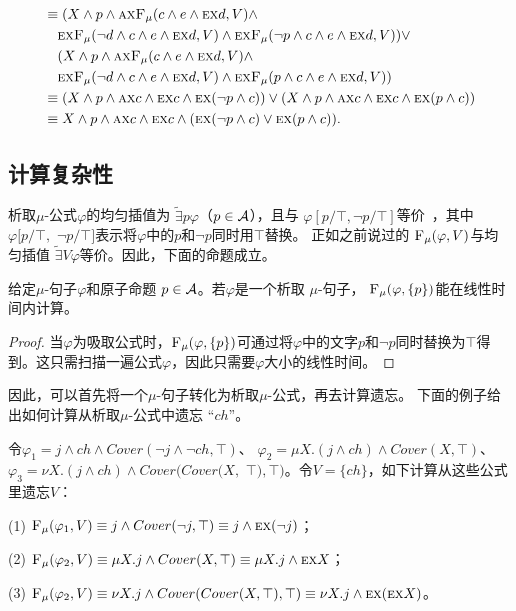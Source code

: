 \begin{example}
\begin{align*}
		& \equiv (X \wedge p \wedge \textsc{a}\textsc{x}{\textsc{F}_{\textsc{$\mu$}}}(c \wedge e \wedge \textsc{e}\textsc{x} d, V) \wedge\\
		& \quad\textsc{e}\textsc{x}{\textsc{F}_{\textsc{$\mu$}}}(\neg d \wedge c \wedge e \wedge \textsc{e}\textsc{x} d, V) \wedge  \textsc{e}\textsc{x}{\textsc{F}_{\textsc{$\mu$}}}(\neg p \wedge c \wedge e \wedge \textsc{e}\textsc{x} d, V) )\vee \\
		& \quad (X \wedge p \wedge \textsc{a}\textsc{x}{\textsc{F}_{\textsc{$\mu$}}}(c \wedge e \wedge \textsc{e}\textsc{x} d, V) \wedge\\
		& \quad\textsc{e}\textsc{x}{\textsc{F}_{\textsc{$\mu$}}}(\neg d \wedge c \wedge e \wedge \textsc{e}\textsc{x} d, V) \wedge  \textsc{e}\textsc{x}{\textsc{F}_{\textsc{$\mu$}}}( p \wedge c \wedge e \wedge \textsc{e}\textsc{x} d, V)) \\
		& \equiv (X \wedge p \wedge \textsc{a}\textsc{x} c \wedge \textsc{e}\textsc{x} c \wedge \textsc{e}\textsc{x} (\neg p \wedge c)) \vee 
		(X \wedge p \wedge \textsc{a}\textsc{x} c \wedge \textsc{e}\textsc{x} c \wedge \textsc{e}\textsc{x} (p \wedge c)) \\
		& \equiv X \wedge p \wedge \textsc{a}\textsc{x} c \wedge \textsc{e}\textsc{x} c \wedge (\textsc{e}\textsc{x} (\neg p \wedge c) \vee \textsc{e}\textsc{x} (p \wedge c)).
	\end{align*}
\end{example}

\subsection{计算复杂性}
析取$\mu$-公式$\varphi$的均匀插值为 $\widetilde{\exists}p \varphi$（$p\in {\cal A}$），且与 $\varphi[p/\top,\neg p/\top]$等价~\cite{d2006modal}，其中$\varphi[p/\top,$ $\neg p/\top]$表示将$\varphi$中的$p$和$\neg p$同时用$\top$替换。
正如之前说过的 ${\textsc{F}_{\textsc{$\mu$}}}(\varphi, V)$与均匀插值 $\widetilde{\exists}V \varphi$等价\cite{d2006modal}。因此，下面的命题成立。
\begin{corollary}\label{pro:disLiT}
	给定$\mu$-句子$\varphi$和原子命题 $p\in {\cal A}$。若$\varphi$是一个析取 $\mu$-句子， ${\textsc{F}_{\textsc{$\mu$}}}(\varphi, \{p\})$能在线性时间内计算。
\end{corollary}
\begin{proof}
	当$\varphi$为吸取公式时，${\textsc{F}_{\textsc{$\mu$}}}(\varphi, \{p\})$可通过将$\varphi$中的文字$p$和$\neg p$同时替换为$\top$得到。这只需扫描一遍公式$\varphi$，因此只需要$\varphi$大小的线性时间。
\end{proof}

因此，可以首先将一个$\mu$-句子转化为析取$\mu$-公式，再去计算遗忘。
下面的例子给出如何计算从析取$\mu$-公式中遗忘 “$ch$”。
\begin{example}
	令$\varphi_1=  j \wedge ch \wedge Cover(\neg j \wedge \neg ch, \top)$、 $\varphi_2= \mu X. (j \wedge ch) \wedge Cover(X, \top)$、 $\varphi_3=  \nu X. (j \wedge ch) \wedge Cover(Cover(X,$ $\top), \top)$。令$V=\{ch\}$，如下计算从这些公式里遗忘$V$：
	
	(1) ${\textsc{F}_{\textsc{$\mu$}}}(\varphi_1, V) \equiv j \wedge Cover(\neg j, \top) \equiv j \wedge \textsc{e} \textsc{x}(\neg j)$；
	
	(2) ${\textsc{F}_{\textsc{$\mu$}}}(\varphi_2, V) \equiv \mu X. j  \wedge Cover(X, \top) \equiv \mu X. j \wedge \textsc{e} \textsc{x} X$；
	
	(3) ${\textsc{F}_{\textsc{$\mu$}}}(\varphi_2, V) \equiv \nu X. j \wedge Cover(Cover(X, \top), \top) \equiv \nu X. j \wedge \textsc{e} \textsc{x}(\textsc{e} \textsc{x} X)$。
\end{example}

